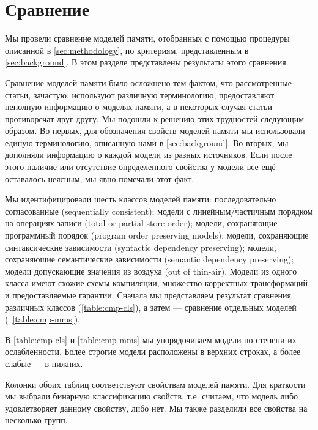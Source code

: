 \section{Сравнение}
\label{sec:comparison}

Мы провели сравнение моделей памяти, 
отобранных с помощью процедуры описанной в \cref{sec:methodology},
по критериям, представленным в \cref{sec:background}. 
В этом разделе представлены результаты этого сравнения.

Сравнение моделей памяти было 
осложнено тем фактом, что рассмотренные 
статьи, зачастую, используют различную терминологию, 
предоставляют неполную информацию о моделях памяти, а в некоторых случая статьи  
 противоречат друг другу. 
Мы подошли к решению этих трудностей следующим образом. 
Во-первых, для обозначения свойств моделей памяти
мы использовали единую терминологию,
описанную нами в \cref{sec:background}.
Во-вторых, мы дополняли информацию о каждой модели 
из разных источников. Если после этого 
наличие или отсутствие определенного свойства у модели 
все ещё оставалось неясным, мы явно помечали этот факт. 

Мы идентифицировали шесть классов моделей памяти:
последовательно согласованные (sequentially consistent); 
модели с линейным/частичным порядком на операциях записи
(total or partial store order);
модели, сохраняющие программный порядок
(program order preserving models); 
модели, сохраняющие синтаксические зависимости 
(syntactic dependency preserving);
модели, сохраняющие семантические зависимости
(semantic dependency preserving);
модели допускающие значения из воздуха
(out of thin-air). 
Модели из одного класса имеют схожие схемы компиляции, 
множество корректных трансформаций и предоставляемые гарантии. 
Сначала мы представляем результат сравнения различных классов 
(\cref{table:cmp-cls}),
а затем --- сравнение отдельных моделей 
(~\cref{table:cmp-mms}).



В \cref{table:cmp-cls} и \cref{table:cmp-mms} 
мы упорядочиваем модели по степени их ослабленности. 
Более строгие модели расположены в верхних строках, 
а более слабые --- в нижних.  

Колонки обоих таблиц соответствуют свойствам моделей памяти.
Для краткости мы выбрали бинарную классификацию свойств,
т.е. считаем, что модель либо удовлетворяет данному свойству, либо нет. 
Мы также разделили все свойства на несколько групп. 

